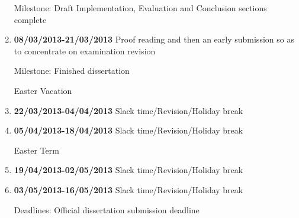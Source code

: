\begin{enumerate}
Milestone: Draft Implementation, Evaluation and Conclusion sections complete

\item {\bf 08/03/2013-21/03/2013} Proof reading and then an early submission so as to concentrate on examination revision

Milestone: Finished dissertation

Easter Vacation
\item {\bf 22/03/2013-04/04/2013} Slack time/Revision/Holiday break

\item {\bf 05/04/2013-18/04/2013} Slack time/Revision/Holiday break

Easter Term
\item {\bf 19/04/2013-02/05/2013} Slack time/Revision/Holiday break

\item {\bf 03/05/2013-16/05/2013} Slack time/Revision/Holiday break

Deadlines: Official dissertation submission deadline

\end{enumerate}
